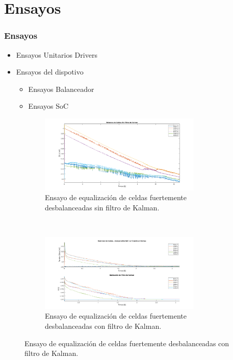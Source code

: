 \documentclass[10pt]{beamer}
\theoremstyle{remark}
\theoremstyle{definition}
\begin{document}
\section{Ensayos}
\begin{frame}[allowframebreaks]
    \frametitle{Ensayos}
    \begin{itemize}
        \item 	Ensayos Unitarios Drivers
        \item 	Ensayos del dispotivo
            \begin{itemize}
                \item 	Ensayos Balanceador
                \item   Ensayos SoC
            \end{itemize}
    \end{itemize}

    \begin{figure}[h!]
        \ContinuedFloat
        \begin{subfigure}{\textwidth}
            \centering
            \includegraphics[width=0.85\textwidth]{images/SF_Balancing_19_03_2019_F.png}
            \caption{Ensayo de equalización de celdas fuertemente desbalanceadas sin 
            filtro de Kalman.}
            \label{Test_BQ76_1}
        \end{subfigure}
        ~ 
        \begin{subfigure}{\textwidth}
            \centering
            \includegraphics[width=0.85\textwidth]{images/MRG_loading_26_3_F.png}
            \caption{Ensayo de equalización de celdas fuertemente desbalanceadas con 
            filtro de Kalman.}
            \label{Test_BQ76_2}
        \end{subfigure}
    \end{figure}

\end{frame}
\end{document}
